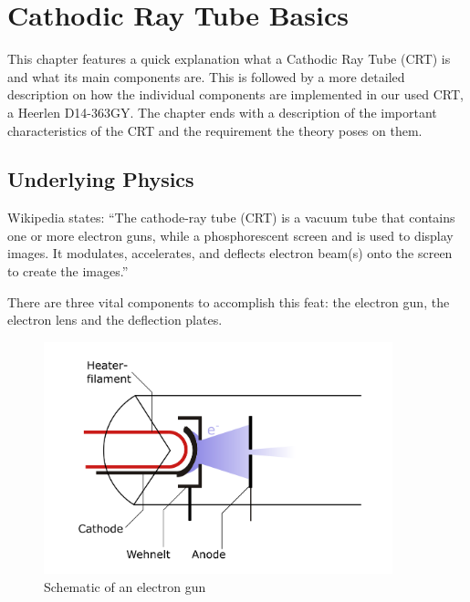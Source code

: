 
\chapter{Cathodic Ray Tube Basics}
\label{ch:Cathodic Ray Tube Basics}

This chapter features a quick explanation what a Cathodic Ray Tube (CRT) is and what its main components are. This is followed by a more detailed description on how the individual components are implemented in our used CRT, a Heerlen D14-363GY. The chapter ends with a description of the important characteristics of the CRT and the requirement the theory poses on them.

\section{Underlying Physics}


Wikipedia states: ``The cathode-ray tube (CRT) is a vacuum tube that contains one or more electron guns, while a phosphorescent screen and is used to display images. It modulates, accelerates, and deflects electron beam(s) onto the screen to create the images.''

There are three vital components to accomplish this feat: the electron gun, the electron lens and the deflection plates.

\begin{figure}
	\centering
	\includegraphics[width=0.9\textwidth]{Chapters/CRT-Basics/electron_gun}
	\caption{Schematic of an electron gun}
	\label{fig:electrongun}
\end{figure}

